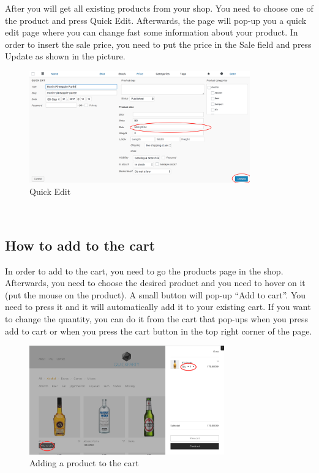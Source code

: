 \documentclass[12p]{article}
\begin{document}
\newpage %
After you will get all existing products from your shop. You need to choose one of the product and press Quick Edit. Afterwards, the page will pop-up you a quick edit page where you can change fast some information about your product. In order to insert the sale price, you need to put the price in the Sale field and press Update as shown in the picture.
\\
\begin{figure}[ht]
    \centering
    \includegraphics[width=0.85\textwidth]{8.png}
    \caption{Quick Edit}
    \label{fig:wordpress_quick_edit}
\end{figure}
\\
\subsection{How to add to the cart}
In order to add to the cart, you need to go the products page in the shop. Afterwards, you need to choose the desired product and you need to hover on it (put the mouse on the product). A small button will pop-up “Add to cart”. You need to press it and it will automatically add it to your existing cart. If you want to change the quantity, you can do it from the cart that pop-ups when you press add to cart or when you press the cart button in the top right corner of the page.
\\
\begin{figure}[ht]
    \centering
    \includegraphics[width=0.75\textwidth]{9.png}
    \caption{Adding a product to the cart}
    \label{fig:wordpress_add_to_cart}
\end{figure}
\\
\end{document}
